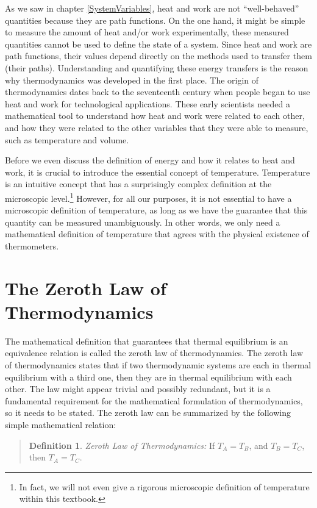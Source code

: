 \documentclass[
  9pt,
]{extbook}
\theoremstyle{definition}
\newtheorem{definition}{Definition}[chapter]
\theoremstyle{definition}
\theoremstyle{definition}
\theoremstyle{remark}
\begin{document}
As we saw in chapter \ref{SystemVariables}, heat and work are not ``well-behaved'' quantities because they are path functions. On the one hand, it might be simple to measure the amount of heat and/or work experimentally, these measured quantities cannot be used to define the state of a system. Since heat and work are path functions, their values depend directly on the methods used to transfer them (their paths). Understanding and quantifying these energy transfers is the reason why thermodynamics was developed in the first place. The origin of thermodynamics dates back to the seventeenth century when people began to use heat and work for technological applications. These early scientists needed a mathematical tool to understand how heat and work were related to each other, and how they were related to the other variables that they were able to measure, such as temperature and volume.

Before we even discuss the definition of energy and how it relates to heat and work, it is crucial to introduce the essential concept of temperature. Temperature is an intuitive concept that has a surprisingly complex definition at the microscopic level.\footnote{In fact, we will not even give a rigorous microscopic definition of temperature within this textbook.} However, for all our purposes, it is not essential to have a microscopic definition of temperature, as long as we have the guarantee that this quantity can be measured unambiguously. In other words, we only need a mathematical definition of temperature that agrees with the physical existence of thermometers.

\hypertarget{the-zeroth-law-of-thermodynamics}{%
\section{The Zeroth Law of Thermodynamics}\label{the-zeroth-law-of-thermodynamics}}

The mathematical definition that guarantees that thermal equilibrium is an equivalence relation is called the zeroth law of thermodynamics. The zeroth law of thermodynamics states that if two thermodynamic systems are each in thermal equilibrium with a third one, then they are in thermal equilibrium with each other. The law might appear trivial and possibly redundant, but it is a fundamental requirement for the mathematical formulation of thermodynamics, so it needs to be stated. The zeroth law can be summarized by the following simple mathematical relation:

\begin{quote}
\begin{definition}
\protect\hypertarget{def:zerothlaw}{}{\label{def:zerothlaw} }\emph{Zeroth Law of Thermodynamics:} If \(T_A = T_B\), and \(T_B = T_C\), then \(T_A = T_C\).
\end{definition}
\end{quote}
\end{document}
